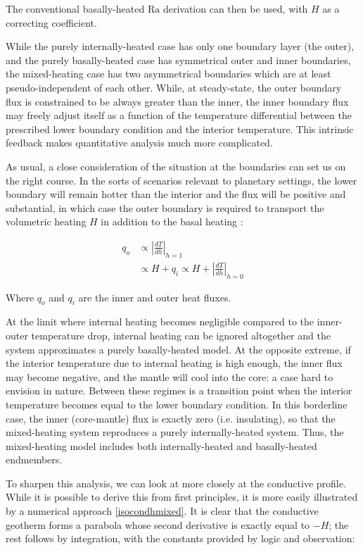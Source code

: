 The conventional basally-heated $\mathrm{Ra}$ derivation can then be used, with $H$ as a correcting coefficient.

While the purely internally-heated case has only one boundary layer (the outer), and the purely basally-heated case has symmetrical outer and inner boundaries, the mixed-heating case has two asymmetrical boundaries which are at least pseudo-independent of each other. While, at steady-state, the outer boundary flux is constrained to be always greater than the inner, the inner boundary flux may freely adjust itself as a function of the temperature differential between the prescribed lower boundary condition and the interior temperature. This intrinsic feedback makes quantitative analysis much more complicated.

As usual, a close consideration of the situation at the boundaries can set us on the right course. In the sorts of scenarios relevant to planetary settings, the lower boundary will remain hotter than the interior and the flux will be positive and substantial, in which case the outer boundary is required to transport the volumetric heating $H$ in addition to the basal heating \cite{Moore2008-je}:

\begin{align*}
{q}_{o} &\propto {\left| \frac{dT}{dh} \right|}_{h=1} \\
&\propto H + {q}_{i} \propto H + {\left| \frac{dT}{dh} \right|}_{h=0}
\end{align*}

Where ${q}_{o}$ and ${q}_{i}$ are the inner and outer heat fluxes.

At the limit where internal heating becomes negligible compared to the inner-outer temperature drop, internal heating can be ignored altogether and the system approximates a purely basally-heated model. At the opposite extreme, if the interior temperature due to internal heating is high enough, the inner flux may become negative, and the mantle will cool into the core: a case hard to envision in nature. Between these regimes is a transition point when the interior temperature becomes equal to the lower boundary condition. In this borderline case, the inner (core-mantle) flux is exactly zero (i.e. insulating), so that the mixed-heating system reproduces a purely internally-heated system. Thus, the mixed-heating model includes both internally-heated and basally-heated endmembers.

To sharpen this analysis, we can look at more closely at the conductive profile. While it is possible to derive this from first principles, it is more easily illustrated by a numerical approach \ref{isocondhmixed}. It is clear that the conductive geotherm forms a parabola whose second derivative is exactly equal to $-H$; the rest follows by integration, with the constants provided by logic and observation:

